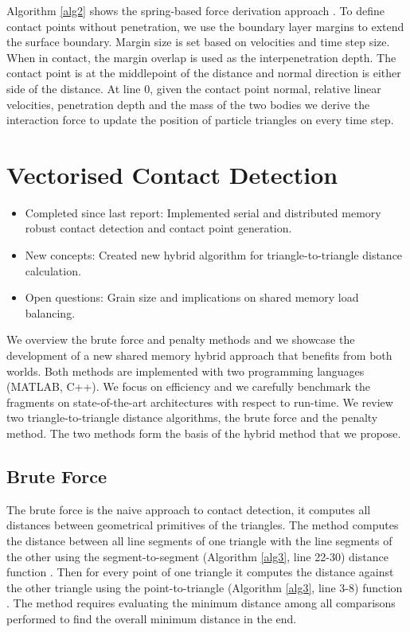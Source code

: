 \documentclass[times,12pt]{article}
\begin{document}
Algorithm \ref{alg2} shows the spring-based force derivation approach \cite{Koziara2008, solberg2000, Wachs2012, Williams1999}. To define contact points without penetration, we use the boundary layer margins to extend the surface boundary. Margin size is set based on velocities and time step size. When in contact, the margin overlap is used as the interpenetration depth. The contact point is at the middlepoint of the distance and normal direction is either side of the distance. At line 0, given the contact point normal, relative linear velocities, penetration depth and the mass of the two bodies we derive the interaction force to update the position of particle triangles on every time step.

\clearpage

\section{Vectorised Contact Detection}
\vspace{5mm}
\begin{itemize}
\item Completed since last report: Implemented serial and distributed memory robust contact detection and contact point generation.
\item New concepts: Created new hybrid algorithm for triangle-to-triangle distance calculation.
\item Open questions: Grain size and implications on shared memory load balancing.
\end{itemize}

We overview the brute force and penalty methods and we showcase the development of a new shared memory hybrid approach that benefits from both worlds. Both methods are implemented with two programming languages (MATLAB, C++). We focus on efficiency and we carefully benchmark the fragments on state-of-the-art architectures  with respect to run-time. We review two triangle-to-triangle distance algorithms, the brute force and the penalty method. The two methods form the basis of the hybrid method that we propose.


\subsection{Brute Force}
The brute force is the naive approach to contact detection, it computes all distances between geometrical primitives of the triangles. The method computes the distance between all line segments of one triangle with the line segments of the other using the segment-to-segment (Algorithm \ref{alg3}, line 22-30) distance function \cite{Ericson2005, Tropp2006}. Then for every point of one triangle it computes the distance against the other triangle using the point-to-triangle (Algorithm \ref{alg3}, line 3-8) function \cite{Eberly1999, Ericson2005}. The method requires evaluating the minimum distance among all comparisons performed to find the overall minimum distance in the end.
\end{document}
